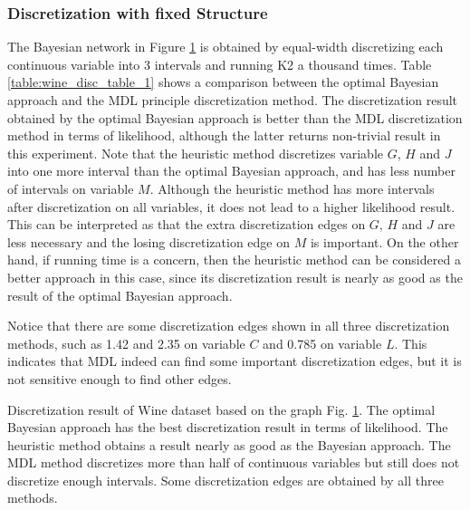\subsubsection{Discretization with fixed Structure}
\label{subsubsec:wine_exp1}

The Bayesian network in Figure \ref{fig:wine_graph_1} is obtained by equal-width discretizing each continuous variable into 3 intervals and running K2 a thousand times. Table \ref{table:wine_disc_table_1} shows a comparison between the optimal Bayesian approach and the MDL principle discretization method.
The discretization result obtained by the optimal Bayesian approach is better than the MDL discretization method in terms of likelihood, although the latter returns non-trivial result in this experiment. Note that the
heuristic method discretizes variable $G$, $H$ and $J$ into one more interval than the optimal Bayesian approach, and has less number of intervals on variable $M$. Although the heuristic method has more intervals after discretization on all variables, it does not lead to a higher likelihood result. This can be interpreted as that the extra discretization edges on $G$, $H$ and $J$ are less necessary and the losing discretization edge on $M$ is important. On the other hand, if running time is a concern, then the heuristic method can be considered a better approach in this case, since its discretization result is nearly as good as the result of the optimal Bayesian approach.

Notice that there are some discretization edges shown in all three discretization methods, such as \num{1.42} and \num{2.35} on variable $C$ and \num{0.785} on variable $L$. This indicates that MDL indeed can find some important discretization edges, but it is not sensitive enough to find other edges.

\begin{figure}[ht]
  \centering
      
  \caption{}
  \label{fig:wine_graph_1}
\end{figure}

\begin{table}
  \centering
  \scalebox{1.0}{
  
  }
  \caption{Discretization result of Wine dataset based on the graph Fig. \ref{fig:wine_graph_1}. The optimal Bayesian approach has the best discretization result in terms of likelihood. The heuristic method obtains a result nearly as good as the Bayesian approach. The MDL method discretizes more than half of continuous variables but still does not discretize enough intervals. Some discretization edges are obtained by all three methods.
  }
  \label{table:wine_disc_table_1}
\end{table}

